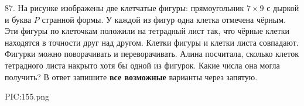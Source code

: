 87. На рисунке изображены две клетчатые фигуры: прямоугольник $7\times9$ с дыркой и буква $P$ странной формы. У каждой из фигур одна клетка отмечена чёрным. Эти фигуры по клеточкам положили на тетрадный лист так, что чёрные клетки находятся в точности друг над другом. Клетки фигуры и клетки листа совпадают. Фигурки можно поворачивать и переворачивать. Алина посчитала, сколько клеток тетрадного листа накрыто хотя бы одной из фигурок. Какие числа она могла получить? В ответ запишите {\bf все возможные} варианты через запятую.
\begin{center}
{{PIC:155.png}}
\end{center}
